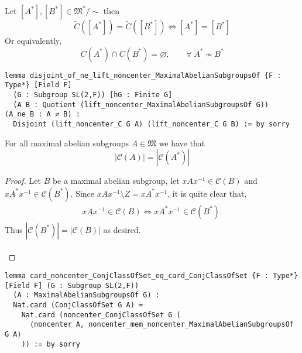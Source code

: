 \begin{theorem}
  \label{disjoint_of_ne_lift_noncenter_MaximalAbelianSubgroupsOf}
  Let $[A^*], [B^*] \in \mathfrak{M}^* / \sim$ then
  \[
  \tilde{C}([A^*]) = \tilde{C}([B^*]) \iff [A^*] = [B^*]
  \]
  Or equivalently,
  \[ 
  C(A^*) \cap C(B^*) = \varnothing, \qquad \forall \;  A^* \not\sim B^* 
  \]
\end{theorem}
\begin{footnotesize}
\begin{verbatim}
lemma disjoint_of_ne_lift_noncenter_MaximalAbelianSubgroupsOf {F : Type*} [Field F]
  (G : Subgroup SL(2,F)) [hG : Finite G]
  (A B : Quotient (lift_noncenter_MaximalAbelianSubgroupsOf G)) (A_ne_B : A ≠ B) :
  Disjoint (lift_noncenter_C G A) (lift_noncenter_C G B) := by sorry
\end{verbatim}
\end{footnotesize}


\begin{theorem}
  \label{card_noncenter_ConjClassOfSet_eq_card_ConjClassOfSet}
  For all maximal abelian subgroups $A \in \mathfrak{M}$ we have that 
  \[
  |\mathcal{C}(A)| = |\mathcal{C}(A^*)|
  \]
\end{theorem}
\begin{proof}
  Let $B$ be a maximal abelian subgroup, let $x A x^{-1} \in \mathcal{C}(B)$ and $x A^* x^{-1} \in \mathcal{C}(B^*)$. Since $x A x^{-1} \! \setminus \! Z = x A^* x^{-1}$, it is quite clear that,
  \begin{align*} x A x^{-1} \in \mathcal{C}(B) \iff x A^* x^{-1} \in \mathcal{C}(B^*).
  \end{align*}
  Thus $|\mathcal{C}(B^*)| = |\mathcal{C}(B)|$ as desired. \\
  \\
\end{proof}
\begin{footnotesize}
\begin{verbatim}
lemma card_noncenter_ConjClassOfSet_eq_card_ConjClassOfSet {F : Type*} [Field F] (G : Subgroup SL(2,F))
  (A : MaximalAbelianSubgroupsOf G) :
  Nat.card (ConjClassOfSet G A) =
    Nat.card (noncenter_ConjClassOfSet G (
      ⟨noncenter A, noncenter_mem_noncenter_MaximalAbelianSubgroupsOf G A⟩
    )) := by sorry
\end{verbatim}
\end{footnotesize}

